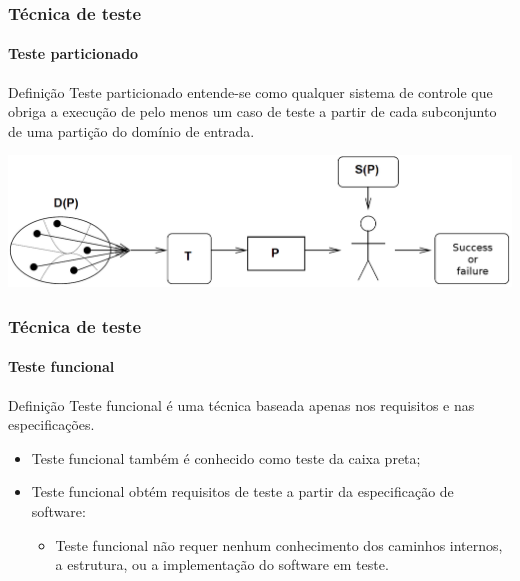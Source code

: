 \begin{frame}
\frametitle{Técnica de teste}
\framesubtitle{Teste particionado}
\label{concept:partition-testing}

\begin{block:concept}{Definição}
Teste particionado entende-se como qualquer sistema de controle que obriga a execução de pelo menos um caso de teste a partir de cada subconjunto de uma partição do domínio de entrada.
\end{block:concept}

\begin{block:fact}{}
    \centering
    \includegraphics[width=\textwidth]{teste-de-software/conceitos-basicos/Imagens/partition-software-testing}
\end{block:fact}
\end{frame}



\begin{frame}
\frametitle{Técnica de teste}
\framesubtitle{Teste funcional}
\label{concept:functional-testing}

\begin{block:concept}{Definição}
Teste funcional é uma técnica baseada apenas nos requisitos e nas especificações.
\end{block:concept}

\begin{block:fact}{}
\begin{itemize}
	\item Teste funcional também é conhecido como teste da caixa preta;

	\item Teste funcional obtém requisitos de teste a partir da especificação de software:
	\begin{itemize}
		\item Teste funcional não requer nenhum conhecimento dos caminhos internos, a estrutura, ou a implementação do software em teste.
	\end{itemize}
\end{itemize}
\end{block:fact}

\hfill
{}
\end{frame}


